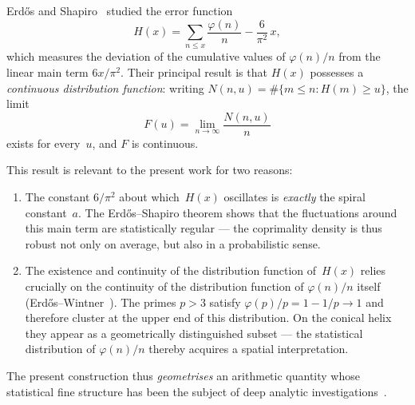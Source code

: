 \begin{remark}
\label{rem:erdos_shapiro}
Erd\H{o}s and Shapiro~\cite{ErdosShapiro1955} studied the error function
\begin{equation}\label{eq:H_erdos}
  H(x) = \sum_{n \leqslant x} \frac{\varphi(n)}{n}
         - \frac{6}{\pi^2}\,x,
\end{equation}
which measures the deviation of the cumulative values of $\varphi(n)/n$
from the linear main term $6x/\pi^2$. Their principal result is that
$H(x)$ possesses a \emph{continuous distribution function}: writing
$N(n,u) = \#\{m \leqslant n : H(m) \geqslant u\}$, the limit
\[
  F(u) = \lim_{n \to \infty} \frac{N(n,u)}{n}
\]
exists for every~$u$, and $F$ is continuous.

This result is relevant to the present work for two reasons:
\begin{enumerate}
\item The constant $6/\pi^2$ about which~$H(x)$ oscillates is
      \emph{exactly} the spiral constant~$a$. The Erd\H{o}s--Shapiro
      theorem shows that the fluctuations around this main term are
      statistically regular — the coprimality density is thus robust
      not only on average, but also in a probabilistic sense.
\item The existence and continuity of the distribution function of~$H(x)$
      relies crucially on the continuity of the distribution function
      of $\varphi(n)/n$ itself (Erd\H{o}s--Wintner~\cite{ErdosWintner1939}).
      The primes $p > 3$ satisfy $\varphi(p)/p = 1 - 1/p \to 1$ and
      therefore cluster at the upper end of this distribution. On the
      conical helix they appear as a geometrically distinguished
      subset — the statistical distribution of $\varphi(n)/n$ thereby
      acquires a spatial interpretation.
\end{enumerate}

The present construction thus \emph{geometrises} an arithmetic
quantity whose statistical fine structure has been the subject of
deep analytic investigations~\cite{ErdosShapiro1955,
Erdos1974distribution, ErdosHall1973}.
\end{remark}

